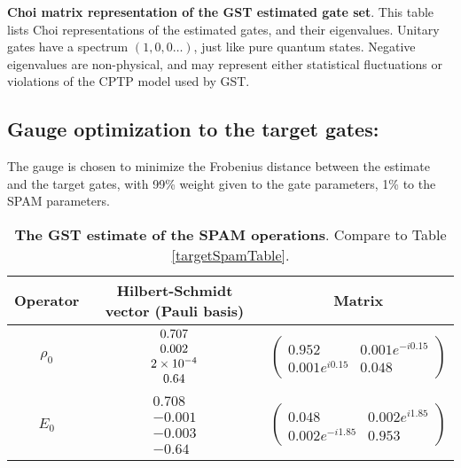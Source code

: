 {\begin{table}[h]
\begin{center}
\caption{\textbf{Choi matrix representation of the GST estimated gate set}.  This table lists Choi representations of the estimated gates, and their eigenvalues.  Unitary gates have a spectrum $(1,0,0\ldots)$, just like pure quantum states.  Negative eigenvalues are non-physical, and may represent either statistical fluctuations or violations of the CPTP model used by GST.\label{bestTargetSpamGatesetChoiTable}}
\end{center}
\end{table}

\clearpage

\subsection{Gauge optimization to the target gates:}
The gauge is chosen to minimize the Frobenius distance between the estimate and the target gates, with 99\% weight given to the gate parameters, 1\% to the SPAM parameters.


\begin{table}[h]
\begin{center}
\begin{tabular}[l]{|c|c|c|}
\hline
Operator & Hilbert-Schmidt vector (Pauli basis) & Matrix \\ \hline
$\rho_{0}$ & $ \begin{array}{c}
0.707 \\ 
0.002 \\ 
2\times 10^{-4} \\ 
0.64
 \end{array} $
 & $ \left(\!\!\begin{array}{cc}
0.952 & 0.001e^{-i0.15} \\ 
0.001e^{i0.15} & 0.048
 \end{array}\!\!\right) $
 \\ \hline
$E_{0}$ & $ \begin{array}{c}
0.708 \\ 
-0.001 \\ 
-0.003 \\ 
-0.64
 \end{array} $
 & $ \left(\!\!\begin{array}{cc}
0.048 & 0.002e^{i1.85} \\ 
0.002e^{-i1.85} & 0.953
 \end{array}\!\!\right) $
 \\ \hline
\end{tabular}

\caption{\textbf{The GST estimate of the SPAM operations}.  Compare to Table \ref{targetSpamTable}.\label{bestTargetGatesGatesetSpamTable}}
\end{center}
\end{table}

}
